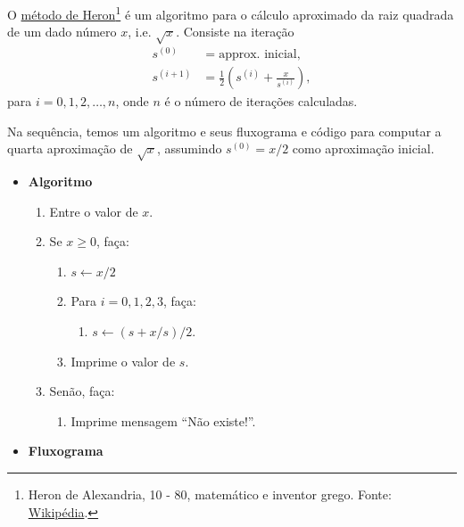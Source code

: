 \begin{ex}\label{cap_lingua_sec_algoprog:ex:metHeron}
  O \href{https://en.wikipedia.org/wiki/Methods_of_computing_square_roots#Heron's_method}{método de Heron}\footnote{Heron de Alexandria, 10 - 80, matemático e inventor grego. Fonte: \href{https://pt.wikipedia.org/wiki/Heron\_de\_Alexandria}{Wikipédia}.} é um algoritmo para o cálculo aproximado da raiz quadrada de um dado número $x$, i.e. $\sqrt{x}$. Consiste na iteração
  \begin{align}
    s^{(0)} &= \text{approx. inicial},\\
    s^{(i+1)} &= \frac{1}{2}\left(s^{(i)} + \frac{x}{s^{(i)}}\right),
  \end{align}
  para $i=0,1,2,\ldots,n$, onde $n$ é o número de iterações calculadas.

  Na sequência, temos um algoritmo e seus fluxograma e código {\python} para computar a quarta aproximação de $\sqrt{x}$, assumindo $s^{(0)} = x/2$ como aproximação inicial.

  \begin{itemize}
  \item {\bf Algoritmo}
    \begin{enumerate}
    \item Entre o valor de $x$.
    \item Se $x\geq 0$, faça:
      \begin{enumerate}
      \item $s \leftarrow x/2$
      \item Para $i = 0,1,2,3$, faça:
        \begin{enumerate}
        \item $s \leftarrow (s + x/s)/2$.
        \end{enumerate}
      \item Imprime o valor de $s$.
      \end{enumerate}
    \item Senão, faça:
      \begin{enumerate}
      \item Imprime mensagem ``Não existe!''.
      \end{enumerate}
    \end{enumerate}

  \item {\bf Fluxograma}


\end{itemize}
\end{ex}
